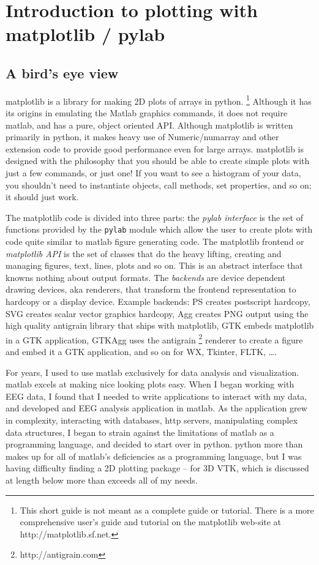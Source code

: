 
\chapter[matplotlib]{Introduction to plotting with matplotlib / pylab}


\section[Overview]{A bird's eye view}

matplotlib is a library for making 2D plots of arrays in python.%
\footnote{This short guide is not meant as a complete guide or tutorial. There
is a more comprehensive user's guide and tutorial on the matplotlib
web-site at http://matplotlib.sf.net.%
} Although it has its origins in emulating the Matlab graphics commands,
it does not require matlab, and has a pure, object oriented API. Although
matplotlib is written primarily in python, it makes heavy use of Numeric/numarray
and other extension code to provide good performance even for large
arrays. matplotlib is designed with the philosophy that you should
be able to create simple plots with just a few commands, or just one!
If you want to see a histogram of your data, you shouldn't need to
instantiate objects, call methods, set properties, and so on; it should
just work. 

The matplotlib code is divided into three parts: the \textit{pylab
interface} is the set of functions provided by the \texttt{pylab}
module which allow the user to create plots with code quite similar
to matlab figure generating code. The matplotlib frontend or \textit{matplotlib
API} is the set of classes that do the heavy lifting, creating and
managing figures, text, lines, plots and so on. This is an abstract
interface that knowns nothing about output formats. The \textit{backends}
are device dependent drawing devices, aka renderers, that transform
the frontend representation to hardcopy or a display device. Example
backends: PS creates postscript hardcopy, SVG creates scalar vector
graphics hardcopy, Agg creates PNG output using the high quality antigrain
library that ships with matplotlib, GTK embeds matplotlib in a GTK
application, GTKAgg uses the antigrain%
\footnote{http://antigrain.com%
} renderer to create a figure and embed it a GTK application, and so
on for WX, Tkinter, FLTK, \ldots{}.

For years, I used to use matlab exclusively for data analysis and
visualization. matlab excels at making nice looking plots easy. When
I began working with EEG data, I found that I needed to write applications
to interact with my data, and developed and EEG analysis application
in matlab. As the application grew in complexity, interacting with
databases, http servers, manipulating complex data structures, I began
to strain against the limitations of matlab as a programming language,
and decided to start over in python. python more than makes up for
all of matlab's deficiencies as a programming language, but I was
having difficulty finding a 2D plotting package -- for 3D VTK, which
is discussed at length below more than exceeds all of my needs.

